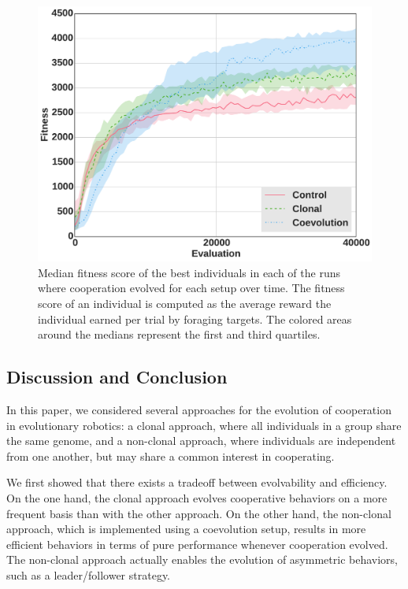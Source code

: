   \begin{figure}[hbtp]
    \begin{center}
      \includegraphics[scale = 0.3]{fig/ArticleRob1/fitnessRecyclingStags.pdf}
      \caption{Median fitness score of the best individuals in each of the runs where cooperation evolved for each setup over time. The fitness score of an individual is computed as the average reward the individual earned per trial by foraging targets. The colored areas around the medians represent the first and third quartiles.}
      \label{fig:RecyclingFitness}
      \end{center}
  \end{figure}

  \subsection{Discussion and Conclusion}

  In this paper, we considered several approaches for the evolution of cooperation in evolutionary robotics: a clonal approach, where all individuals in a group share the same genome, and a non-clonal approach, where individuals are independent from one another, but may share a common interest in cooperating. 

  We first showed that there exists a tradeoff between evolvability and efficiency. On the one hand, the clonal approach evolves cooperative behaviors on a more frequent basis than with the other approach. On the other hand, the non-clonal approach, which is implemented using a coevolution setup, results in more efficient behaviors in terms of pure performance whenever cooperation evolved. The non-clonal approach actually enables the evolution of asymmetric behaviors, such as a leader/follower strategy.

